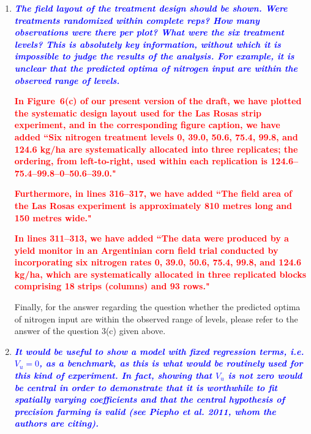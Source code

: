 \documentclass[a4paper]{article}   	%
\newcommand{\qtitle}[1]{\textit{\textbf{#1}}}
\begin{document}
\begin{enumerate}
    
    \item \qtitle{\textcolor{blue}{The field layout of the treatment design should be shown. Were treatments randomized within complete reps? How many observations were there per plot? What were the six treatment levels? This is absolutely key information, without which it is impossible to judge the results of the analysis. For example, it is unclear that the predicted optima of nitrogen input are within the observed range of levels.}}
    
    \textcolor{red}{\textbf{In Figure~6(c) of our present version of the draft, we have plotted the systematic design layout used for the Las Rosas strip experiment, and in the corresponding figure caption, we have added ``Six nitrogen treatment levels 0, 39.0, 50.6, 75.4, 99.8, and 124.6 kg/ha are systematically allocated into three replicates; the ordering, from left-to-right, used within each replication is 124.6--75.4--99.8--0--50.6--39.0."}} 
    
    \textcolor{red}{\textbf{Furthermore, in lines 316--317, we have added ``The field area of the Las Rosas experiment is approximately 810 metres long and 150 metres wide."}} 
    
    \textcolor{red}{\textbf{In lines 311--313, we have added ``The data were produced by a yield monitor in an Argentinian corn field trial conducted by incorporating six nitrogen rates 0, 39.0, 50.6, 75.4, 99.8, and 124.6 kg/ha, which are systematically allocated in three replicated blocks comprising 18 strips (columns) and 93 rows."}}

    Finally, for the answer regarding the question whether the predicted optima of nitrogen input are within the observed range of levels, please refer to the answer of the question 3(c) given above.
    
    \item \qtitle{\textcolor{blue}{It would be useful to show a model with fixed regression terms, i.e. $V_u = 0$, as a benchmark, as this is what would be routinely used for this kind of experiment. In fact, showing that $V_u$ is not zero would be central in order to demonstrate that it is worthwhile to fit spatially varying coefficients and that the central hypothesis of precision farming is valid (see Piepho et al. 2011, whom the authors are citing).}}
    

\end{enumerate}
\end{document}
